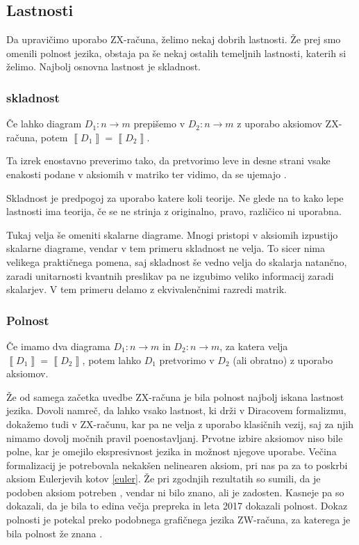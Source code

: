 \documentclass[mat1]{fmfdelo}
\newcommand{\interpret}[1]{\left\llbracket #1 \right\rrbracket}
\begin{document}
\subsection{Lastnosti}
Da upravičimo uporabo ZX-računa, želimo nekaj dobrih lastnosti. Že prej smo omenili polnost jezika, obstaja pa še nekaj ostalih temeljnih lastnosti, katerih si želimo. Najbolj osnovna lastnost je skladnost.
\subsubsection{skladnost}
\begin{izrek}[skladnost]
    Če lahko diagram \(D_1:n\to m\) prepišemo v \(D_2:n\to m\) z uporabo aksiomov ZX-računa, potem \(\interpret{D_1} = \interpret{D_2}\).
\end{izrek}
Ta izrek enostavno preverimo tako, da pretvorimo leve in desne strani vsake enakosti podane v aksiomih v matriko ter vidimo, da se ujemajo \cite[izrek 2.16]{Coecke_2011}.

Skladnost je predpogoj za uporabo katere koli teorije. Ne glede na to kako lepe lastnosti ima teorija, če se ne strinja z originalno, pravo, različico ni uporabna.

Tukaj velja še omeniti skalarne diagrame. Mnogi pristopi v aksiomih izpustijo skalarne diagrame, vendar v tem primeru skladnost ne velja. To sicer nima velikega praktičnega pomena, saj skladnost še vedno velja do skalarja natančno, zaradi unitarnosti kvantnih preslikav pa ne izgubimo veliko informacij zaradi skalarjev. V tem primeru delamo z ekvivalenčnimi razredi matrik.
\subsubsection{Polnost}
\begin{izrek}[Polnost]
    Če imamo dva diagrama \(D_1:n\to m\) in \(D_2:n\to m\), za katera velja \(\interpret{D_1} = \interpret{D_2}\), potem lahko \(D_1\) pretvorimo v \(D_2\) (ali obratno) z uporabo aksiomov.
\end{izrek}
Že od samega začetka uvedbe ZX-računa je bila polnost najbolj iskana lastnost jezika. Dovoli namreč, da lahko vsako lastnost, ki drži v Diracovem formalizmu, dokažemo tudi v ZX-računu, kar pa ne velja z uporabo klasičnih vezij, saj za njih nimamo dovolj močnih pravil poenostavljanj. Prvotne izbire aksiomov niso bile polne, kar je omejilo ekspresivnost jezika in možnost njegove uporabe. Večina formalizacij je potrebovala nekakšen nelinearen aksiom, pri nas pa za to poskrbi aksiom Eulerjevih kotov \ref{euler}. Že pri zgodnjih rezultatih so sumili, da je podoben aksiom potreben \cite{Schr_der_de_Witt_2014}, vendar ni bilo znano, ali je zadosten. Kasneje pa so dokazali, da je bila to edina večja prepreka in leta 2017 dokazali polnost. Dokaz polnosti je potekal preko podobnega grafičnega jezika ZW-računa, za katerega je bila polnost že znana \cite{kangfengng}.
\end{document}
